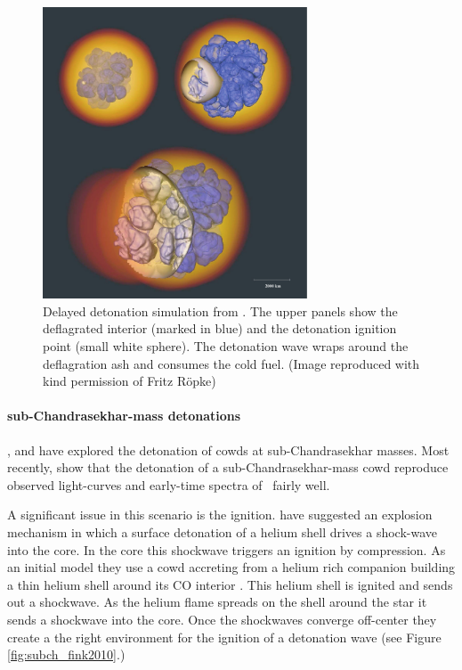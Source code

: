 \begin{figure}[htbp] %
   \centering
   \includegraphics[width=0.7\textwidth]{chapter_intro/plots/ddt_roepke08.pdf}
   \caption[Delayed detonation simulation from \citet{2008NJPh...10l5009R}]{Delayed detonation simulation from \citet{2008NJPh...10l5009R}. The upper panels show the deflagrated interior (marked in blue) and the detonation ignition point (small white sphere). The detonation wave wraps around the deflagration ash and consumes the cold fuel. (Image reproduced with kind permission of Fritz R\"{o}pke)}
   \label{fig:snia_ddt_roepke2007}
\end{figure}


\paragraph{sub-Chandrasekhar-mass detonations}
\label{sec:subchandra}
\citet{1992ApJ...386L..13S}, \citet{1995ApJ...452...62L} and \citet{2010ApJ...714L..52S} have explored the detonation of \glspl{cowd} at sub-Chandrasekhar masses. Most recently, \citet{2010ApJ...714L..52S} show that the detonation of a sub-Chandrasekhar-mass \gls{cowd} reproduce observed light-curves and early-time spectra of \sneia\ fairly well.

A significant issue in this scenario is the ignition. \cite{2010A&A...514A..53F} have suggested an explosion mechanism in which a surface detonation of a helium shell drives a shock-wave into the core. In the core this shockwave triggers an ignition by compression.  As an initial model they use a \gls{cowd} accreting from a helium rich companion building a thin helium shell around its CO interior \citep[described in][]{2007ApJ...662L..95B}. This helium shell is ignited and sends out a shockwave. As the helium flame spreads on the shell around the star it sends a shockwave into the core. Once the shockwaves converge off-center they create a the right environment for the ignition of a detonation wave (see Figure \ref{fig:subch_fink2010}.) 

